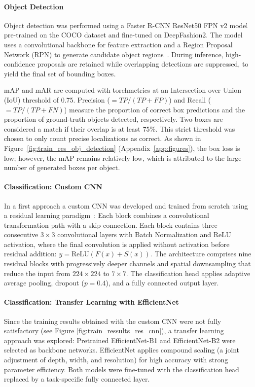 \documentclass{article}
\begin{document}
\paragraph{Object Detection}
Object detection was performed using a Faster R-CNN ResNet50 FPN v2 model pre-trained on the COCO dataset and fine-tuned on DeepFashion2. The model uses a convolutional backbone for feature extraction and a Region Proposal Network (RPN) to generate candidate object regions~\cite{yenigun_r-cnn_2025}. During inference, high-confidence proposals are retained while overlapping detections are suppressed, to yield the final set of bounding boxes.

mAP and mAR are computed with torchmetrics at an Intersection over Union (IoU) threshold of 0.75.
Precision ($= TP/(TP{+}FP)$) and Recall ($= TP/(TP{+}FN)$) measure the proportion of correct box predictions and the proportion of ground-truth objects detected, respectively.
Two boxes are considered a match if their overlap is at least 75$\%$. This strict threshold was chosen to only count precise localizations as correct. As shown in Figure~\ref{fig:train_res_obj_detection} (Appendix~\ref{app:figures}), the box loss is low; however, the mAP remains relatively low, which is attributed to the large number of generated boxes per object.

\paragraph{Classification: Custom CNN}
In a first approach a custom CNN was developed and trained from scratch using a residual learning paradigm~\cite{DBLP:journals/corr/HeZRS15}: Each block combines a convolutional transformation path with a skip connection. Each block contains three consecutive $3\times3$ convolutional layers with Batch Normalization and ReLU activation, where the final convolution is applied without activation before residual addition: $y = \mathrm{ReLU}(F(x) + S(x))$. The architecture comprises nine residual blocks with progressively deeper channels and spatial downsampling that reduce the input from $224\times224$ to $7\times7$. The classification head applies adaptive average pooling, dropout ($p=0.4$), and a fully connected output layer.

\paragraph{Classification: Transfer Learning with EfficientNet}
Since the training results obtained with the custom CNN were not fully satisfactory (see Figure \ref{fig:train_ressults_res_cnn}), a transfer learning approach was explored: Pretrained EfficientNet-B1 and EfficientNet-B2 \cite{tan2020efficientnetrethinkingmodelscaling} were selected as backbone networks. EfficientNet applies compound scaling (a joint adjustment of depth, width, and resolution) for high accuracy with strong parameter efficiency. Both models were fine-tuned with the classification head replaced by a task-specific fully connected layer.
\end{document}

